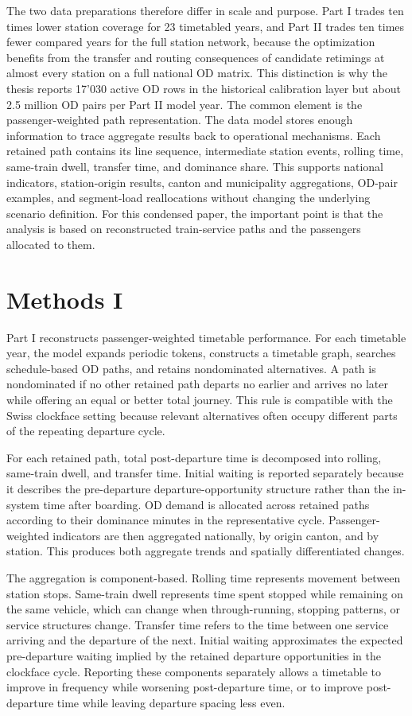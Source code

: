 \documentclass[conference]{IEEEtran}
\begin{document}
The two data preparations therefore differ in scale and purpose. Part I trades ten times lower station coverage for 23 timetabled years, and Part II trades ten times fewer compared years for the full station network, because the optimization benefits from the transfer and routing consequences of candidate retimings at almost every station on a full national OD matrix. This distinction is why the thesis reports 17'030 active OD rows in the historical calibration layer but about 2.5 million OD pairs per Part II model year. The common element is the passenger-weighted path representation. The data model stores enough information to trace aggregate results back to operational mechanisms. Each retained path contains its line sequence, intermediate station events, rolling time, same-train dwell, transfer time, and dominance share. This supports national indicators, station-origin results, canton and municipality aggregations, OD-pair examples, and segment-load reallocations without changing the underlying scenario definition. For this condensed paper, the important point is that the analysis is based on reconstructed train-service paths and the passengers allocated to them.

\section{Methods I}
Part I reconstructs passenger-weighted timetable performance. For each timetable year, the model expands periodic tokens, constructs a timetable graph, searches schedule-based OD paths, and retains nondominated alternatives. A path is nondominated if no other retained path departs no earlier and arrives no later while offering an equal or better total journey. This rule is compatible with the Swiss clockface setting because relevant alternatives often occupy different parts of the repeating departure cycle.

For each retained path, total post-departure time is decomposed into rolling, same-train dwell, and transfer time. Initial waiting is reported separately because it describes the pre-departure departure-opportunity structure rather than the in-system time after boarding. OD demand is allocated across retained paths according to their dominance minutes in the representative cycle. Passenger-weighted indicators are then aggregated nationally, by origin canton, and by station. This produces both aggregate trends and spatially differentiated changes.

The aggregation is component-based. Rolling time represents movement between station stops. Same-train dwell represents time spent stopped while remaining on the same vehicle, which can change when through-running, stopping patterns, or service structures change. Transfer time refers to the time between one service arriving and the departure of the next. Initial waiting approximates the expected pre-departure waiting implied by the retained departure opportunities in the clockface cycle. Reporting these components separately allows a timetable to improve in frequency while worsening post-departure time, or to improve post-departure time while leaving departure spacing less even.
\end{document}
